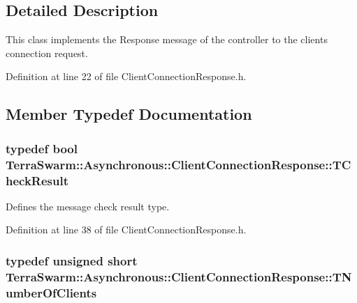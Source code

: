 \subsection{Detailed Description}
This class implements the Response message of the controller to the clients connection request. 

Definition at line 22 of file Client\-Connection\-Response.\-h.



\subsection{Member Typedef Documentation}
\hypertarget{class_terra_swarm_1_1_asynchronous_1_1_client_connection_response_aee00184a039b2aebfcefd9d5b5b71c89}{
\subsubsection[{T\-Check\-Result}]{\setlength{\rightskip}{0pt plus 5cm}typedef bool {\bf Terra\-Swarm\-::\-Asynchronous\-::\-Client\-Connection\-Response\-::\-T\-Check\-Result}}}\label{class_terra_swarm_1_1_asynchronous_1_1_client_connection_response_aee00184a039b2aebfcefd9d5b5b71c89}


Defines the message check result type. 



Definition at line 38 of file Client\-Connection\-Response.\-h.

\hypertarget{class_terra_swarm_1_1_asynchronous_1_1_client_connection_response_a0780de58d62395a3cce207fe96e43ccc}{
\subsubsection[{T\-Number\-Of\-Clients}]{\setlength{\rightskip}{0pt plus 5cm}typedef unsigned short {\bf Terra\-Swarm\-::\-Asynchronous\-::\-Client\-Connection\-Response\-::\-T\-Number\-Of\-Clients}}}\label{class_terra_swarm_1_1_asynchronous_1_1_client_connection_response_a0780de58d62395a3cce207fe96e43ccc}


